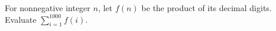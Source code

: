 For nonnegative integer $n$, let $f(n)$ be the product of its decimal digits. Evaluate $\sum_{i=1}^{1000}f(i)$.
